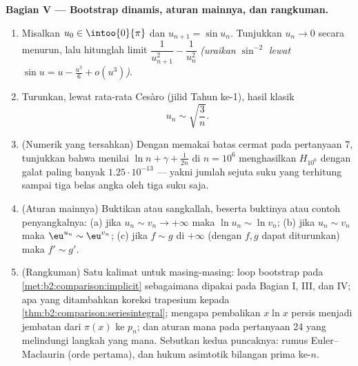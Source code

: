 \begin{problem}
\medskip
\noindent\textbf{Bagian V --- Bootstrap dinamis, aturan
mainnya, dan rangkuman.}
\begin{enumerate}[resume]
  \item Misalkan $u_0 \in \intoo{0}{\pi}$ dan $u_{n+1} = \sin u_n$.
        Tunjukkan $u_n \to 0$ secara menurun, lalu hitunglah limit
        $\dfrac{1}{u_{n+1}^2} - \dfrac{1}{u_n^2}$ \emph{(uraikan
        $\sin^{-2}$ lewat $\sin u = u - \frac{u^3}6 + o(u^3)$)}.
  \item Turunkan, lewat rata-rata Cesàro (jilid Tahun ke-1), hasil klasik
        \[
        u_n \sim \sqrt{\frac{3}{n}} .
        \]
  \item (Numerik yang tersahkan) Dengan memakai batas cermat pada
        pertanyaan 7, tunjukkan bahwa menilai $\ln n + \gamma +
        \frac1{2n}$ di $n = 10^6$ menghasilkan $H_{10^6}$ dengan galat
        paling banyak $1.25\cdot10^{-13}$ --- yakni jumlah sejuta suku
        yang terhitung sampai tiga belas angka oleh tiga suku saja.
  \item (Aturan mainnya) Buktikan atau sangkallah, beserta buktinya atau
        contoh penyangkalnya: (a) jika $u_n \sim v_n \to +\infty$ maka
        $\ln u_n \sim \ln v_n$; (b) jika $u_n \sim v_n$ maka
        $\eu^{u_n} \sim \eu^{v_n}$; (c) jika $f \sim g$ di
        $+\infty$ (dengan $f, g$ dapat diturunkan) maka $f' \sim g'$.
  \item (Rangkuman) Satu kalimat untuk masing-masing: loop bootstrap pada
        \cref{met:b2:comparison:implicit} sebagaimana dipakai pada Bagian
        I, III, dan IV; apa yang ditambahkan koreksi trapesium kepada
        \cref{thm:b2:comparison:seriesintegral}; mengapa pembalikan
        $x\ln x$ persis menjadi jembatan dari $\pi(x)$ ke
        $p_n$; dan aturan mana pada pertanyaan 24 yang melindungi langkah
        yang mana. Sebutkan kedua puncaknya: rumus Euler--Maclaurin
        (orde pertama), dan hukum asimtotik bilangan prima ke-$n$.

\end{enumerate}
\end{problem}
